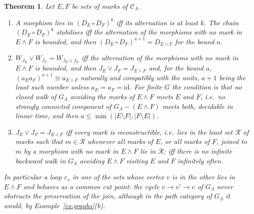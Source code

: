 \documentclass[11pt]{amsart}
\newtheorem{thm}{Theorem}[section]
\theoremstyle{definition}
\begin{document}
\begin{thm}\label{thm:transfer}
Let $E,F$ be sets of marks of $\mathcal C_\Lambda$.
\begin{enumerate}
\item[(i)] A morphism lies in $(D_E\circ D_F)^k$ iff its alternation is
at least $k$. The chain $(D_E\circ D_F)^k$ stabilises iff the
alternation of the morphisms with no mark in $E\wedge F$ is bounded,
and then $(D_E\circ D_F)^{a+1}=D_{E\wedge F}$ for the bound $a$.
\item[(ii)] $W_{J_E}\vee W_{J_F}=W_{J_E\vee J_F}$ iff the alternation of
the morphisms with no mark in $E\wedge F$ is bounded, and then $J_E\vee
J_F=J_{E\wedge F}$ and, for the bound $a$, $(a_Ea_F)^{a+1}\cong
a_{E\wedge F}$ naturally and compatibly with the units, $a+1$ being the
least such number unless $a_E=a_F=\mathrm{id}$. For finite $G$ the
condition is that no closed walk of $G_\Lambda$ avoiding the marks of
$E\wedge F$ meets $E$ and $F$, i.e.\ no strongly connected component of
$G_\Lambda-(E\wedge F)$ meets both, decidable in linear time, and then
$a\le\min(|E\setminus F|,|F\setminus E|)$.
\item[(iii)] $J_E\vee J_F=J_{E\wedge F}$ iff every mark is reconstructible,
i.e.\ lies in the least set $\mathcal R$ of marks such that $m\in\mathcal
R$ whenever all marks of $E$, or all marks of $F$, joined to $m$ by a
morphism with no mark in $E\wedge F$ lie in $\mathcal R$; iff there is
no infinite backward walk in $G_\Lambda$ avoiding $E\wedge F$ visiting
$E$ and $F$ infinitely often.
\end{enumerate}
In particular a loop $\varepsilon_v$ in one of the sets whose vertex $v$
is in the other lies in $E\wedge F$ and behaves as a common cut point:
the cycle $v\to v'\to v$ of $G_\Lambda$ never obstructs the preservation
of the join, although in the path category of $G_\Lambda$ it would, by
Example~\ref{ex:graphs}(b).
\end{thm}
\end{document}
